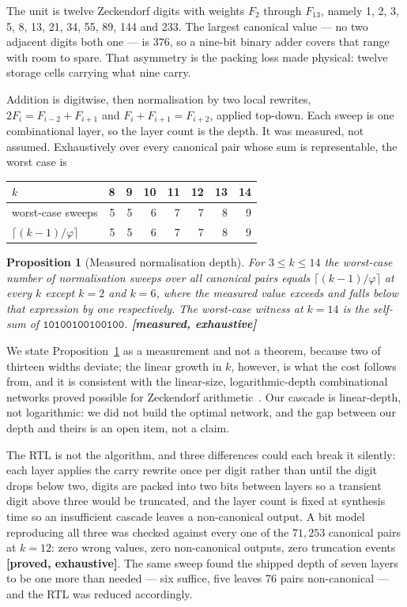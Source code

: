 \documentclass[11pt]{article}
\newtheorem{proposition}[theorem]{Proposition}
\theoremstyle{definition}
\begin{document}
The unit is twelve Zeckendorf digits with weights $F_2$ through $F_{13}$, namely
1, 2, 3, 5, 8, 13, 21, 34, 55, 89, 144 and 233. The largest canonical value --- no two adjacent digits
both one --- is $376$, so a nine-bit binary adder covers that range with room
to spare. That asymmetry is the packing loss made physical: twelve storage cells
carrying what nine carry.

Addition is digitwise, then normalisation by two local rewrites,
$2F_i = F_{i-2} + F_{i+1}$ and $F_i + F_{i+1} = F_{i+2}$, applied top-down. Each
sweep is one combinational layer, so the layer count is the depth. It was
measured, not assumed. Exhaustively over every canonical pair whose sum is
representable, the worst case is

\begin{center}
\begin{tabular}{lrrrrrrr}
\toprule
$k$ & 8 & 9 & 10 & 11 & 12 & 13 & 14 \\
\midrule
worst-case sweeps & 5 & 5 & 6 & 7 & 7 & 8 & 9 \\
$\lceil (k-1)/\varphi \rceil$ & 5 & 5 & 6 & 7 & 7 & 8 & 9 \\
\bottomrule
\end{tabular}
\end{center}

\begin{proposition}[Measured normalisation depth]
\label{prop:zeckdepth}
For $3 \le k \le 14$ the worst-case number of normalisation sweeps over all
canonical pairs equals $\lceil (k-1)/\varphi\rceil$ at every $k$ except $k=2$ and
$k=6$, where the measured value exceeds and falls below that expression by one
respectively. The worst-case witness at $k = 14$ is the self-sum of
$\texttt{10100100100100}$. \textbf{[measured, exhaustive]}
\end{proposition}

We state Proposition~\ref{prop:zeckdepth} as a measurement and not a theorem,
because two of thirteen widths deviate; the linear growth in $k$, however, is what
the cost follows from, and it is consistent with the linear-size,
logarithmic-depth combinational networks proved possible for Zeckendorf
arithmetic~\cite{ahlbach2012efficient}. Our cascade is linear-depth, not
logarithmic: we did not build the optimal network, and the gap between our depth
and theirs is an open item, not a claim.

The RTL is not the algorithm, and three differences could each break it silently:
each layer applies the carry rewrite once per digit rather than until the digit
drops below two, digits are packed into two bits between layers so a transient
digit above three would be truncated, and the layer count is fixed at synthesis
time so an insufficient cascade leaves a non-canonical output. A bit model
reproducing all three was checked against every one of the $71{,}253$ canonical
pairs at $k = 12$: zero wrong values, zero non-canonical outputs, zero
truncation events \textbf{[proved, exhaustive]}. The same sweep found the
shipped depth of seven layers to be one more than needed --- six suffice, five
leaves 76 pairs non-canonical --- and the RTL was reduced accordingly.
\end{document}

